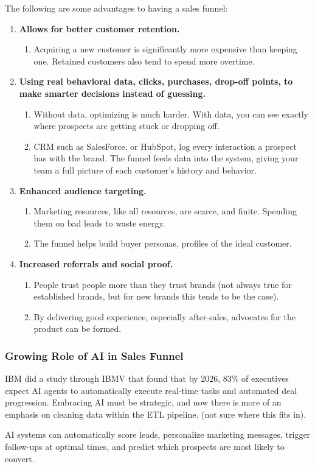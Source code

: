 The following are some advantages to having a sales funnel:
\begin{enumerate}
    \item \textbf{Allows for better customer retention.}
    \begin{enumerate}
        \item Acquiring a new customer is significantly more expensive than keeping one. Retained customers also tend to spend more overtime.
    \end{enumerate}

    \item \textbf{Using real behavioral data, clicks, purchases, drop-off points, to make smarter decisions instead of guessing.}
    \begin{enumerate}
        \item Without data, optimizing is much harder. With data, you can see exactly where prospects are getting stuck or dropping off.
        \item CRM such as SalesForce, or HubSpot, log every interaction a prospect has with the brand. The funnel feeds data into the system, giving your team a full picture of each customer's history and behavior.
    \end{enumerate}

    \item \textbf{Enhanced audience targeting.}
    \begin{enumerate}
        \item Marketing resources, like all resources, are scarce, and finite. Spending them on bad leads to waste energy.
        \item The funnel helps build buyer personas, profiles of the ideal customer.
    \end{enumerate}

    \item \textbf{Increased referrals and social proof.}
    \begin{enumerate}
        \item People trust people more than they trust brands (not always true for established brands, but for new brands this tends to be the case).
        \item By delivering good experience, especially after-sales, advocates for the product can be formed.
    \end{enumerate}

\end{enumerate}

\subsubsection{Growing Role of AI in Sales Funnel}

IBM did a study through IBMV that found that by 2026, 83\% of executives expect AI agents to automatically execute real-time tasks and automated deal progression. Embracing AI must be strategic, and now there is more of an emphasis on cleaning data within the ETL pipeline. (not sure where this fits in).

AI systems can automatically score leads, personalize marketing messages, trigger follow-ups at optimal times, and predict which prospects are most likely to convert.